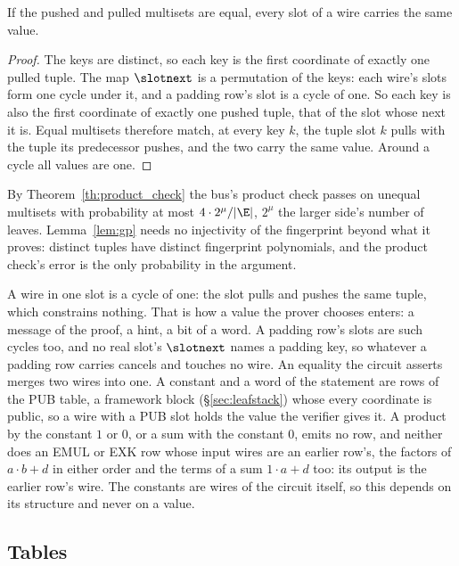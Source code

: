 \begin{lemma}\label{lem:rec-cycles}
If the pushed and pulled multisets are equal, every slot of a wire carries the same value.
\end{lemma}
\begin{proof}
The keys are distinct, so each key is the first coordinate of exactly one pulled tuple. The map $\slotnext$ is a permutation of the keys: each wire's slots form one cycle under it, and a padding row's slot is a cycle of one. So each key is also the first coordinate of exactly one pushed tuple, that of the slot whose next it is. Equal multisets therefore match, at every key $k$, the tuple slot $k$ pulls with the tuple its predecessor pushes, and the two carry the same value. Around a cycle all values are one.
\end{proof}

By Theorem~\ref{th:product_check} the bus's product check passes on unequal multisets with probability at most $4\cdot2^{\mu}/|\E|$, $2^{\mu}$ the larger side's number of leaves. Lemma~\ref{lem:gp} needs no injectivity of the fingerprint beyond what it proves: distinct tuples have distinct fingerprint polynomials, and the product check's error is the only probability in the argument.

A wire in one slot is a cycle of one: the slot pulls and pushes the same tuple, which constrains nothing. That is how a value the prover chooses enters: a message of the proof, a hint, a bit of a word. A padding row's slots are such cycles too, and no real slot's $\slotnext$ names a padding key, so whatever a padding row carries cancels and touches no wire. An equality the circuit asserts merges two wires into one. A constant and a word of the statement are rows of the \textsf{PUB} table, a framework block (\S\ref{sec:leafstack}) whose every coordinate is public, so a wire with a \textsf{PUB} slot holds the value the verifier gives it. A product by the constant $1$ or $0$, or a sum with the constant $0$, emits no row, and neither does an \textsf{EMUL} or \textsf{EXK} row whose input wires are an earlier row's, the factors of $a\cdot b+d$ in either order and the terms of a sum $1\cdot a+d$ too: its output is the earlier row's wire. The constants are wires of the circuit itself, so this depends on its structure and never on a value.

\subsection{Tables}\label{rec:tables}

